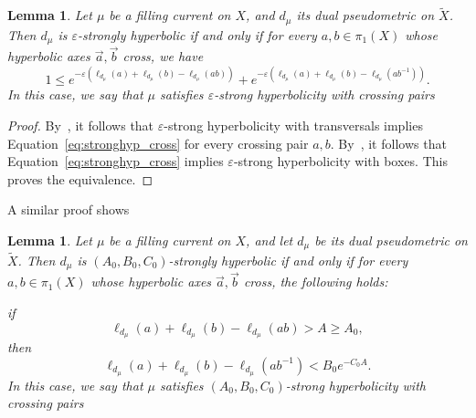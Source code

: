 \documentclass[12pt]{amsart}
\numberwithin{equation}{section}
\numberwithin{figure}{section}
\newtheorem{lemma}[equation]{Lemma}
\theoremstyle{definition}
\theoremstyle{plain}
\newcommand{\ora}[1]{\overrightarrow{#1}}
\newcommand*{\wt}[1]{\widetilde{#1}}
\renewcommand{\epsilon}{\varepsilon}
\begin{document}
\begin{lemma}
Let $\mu$ be a filling current on $X$, and $d_\mu$ its dual pseudometric on $\wt{X}$.
Then $d_\mu$ is $\epsilon$-strongly hyperbolic if and only if for every $a,b \in \pi_1(X)$ whose hyperbolic axes $\ora{a},\ora{b}$ cross, we have
\begin{equation}
1 \leq e^{-\epsilon(\ell_{d_\mu}(a)+\ell_{d_\mu}(b)-\ell_{d_\mu}(ab))} + e^{-\epsilon(\ell_{d_\mu}(a)+\ell_{d_\mu}(b)-\ell_{d_\mu}(ab^{-1}))}.
\label{eq:stronghyp_cross}
\end{equation}
In this case, we say that $\mu$ satisfies \emph{$\epsilon$-strong hyperbolicity with crossing pairs}
\label{lem:stronghyp_cross}
\end{lemma}
\begin{proof}
By~\cite[Lemma~8.13]{MGT25:Intersections}, it follows that $\epsilon$-strong hyperbolicity with transversals implies Equation~\ref{eq:stronghyp_cross} for every crossing pair $a,b$.
By~\cite[Lemma~8.14]{MGT25:Intersections}, it follows that Equation~\ref{eq:stronghyp_cross} implies $\epsilon$-strong hyperbolicity with boxes. This proves the equivalence.
\end{proof}

A similar proof shows

\begin{lemma}
Let $\mu$ be a filling current on $X$, and let $d_\mu$ be its dual pseudometric on $\widetilde{X}$.
Then $d_\mu$ is $(A_0,B_0,C_0)$-strongly hyperbolic if and only if for every $a,b \in \pi_1(X)$ whose hyperbolic axes $\ora{a},\ora{b}$ cross, the following holds:

if
\begin{equation}
\ell_{d_\mu}(a) + \ell_{d_\mu}(b) - \ell_{d_\mu}(ab) > A \geq A_0,
\end{equation}
then
\begin{equation}
\ell_{d_\mu}(a) + \ell_{d_\mu}(b) - \ell_{d_\mu}(ab^{-1}) < B_0 e^{-C_0 A}.
\label{eq:stronghyp_abc_cross}
\end{equation}
In this case, we say that $\mu$ satisfies \emph{$(A_0, B_0, C_0)$-strong hyperbolicity with crossing pairs}
\label{lem:stronghyp_abc_cross}
\end{lemma}
\end{document}
